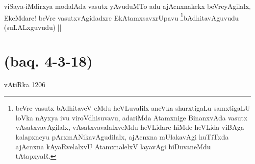 
\begin{artha}
viSaya-iMdirxya modalAda vasutx yAvuduMTo adu ajAcnxnakekx beVreyAgilalx, EkeMdare! beVre vasutxvAgidadxre EkAtamxsavxrUpavu \footnote{beVre vasutx bAdhitaveV eMdu heVLuvalilx aneVka shurxtigaLu samxtigaLU loVka nAyxya ivu viroVdhisuvavu, adariMda Atamxnige BinanxvAda vasutx vAsatxvavAgilalx, vAsatxvavalalxveMdu heVLidare hiMde heVLida viBAga kalapxneyu pArxmANikavAgudilalx, ajAcnxna mUlakavAgi huTiTxda ajAcnxna kAyaRvelalxvU AtamxnalelxV layavAgi biDuvaneMdu tAtapxyaR.}bAdhitavAguvudu (suLALxguvudu) ||
\end{artha}

\section*{(baq. 4-3-18)} vAtiRka 1206
























